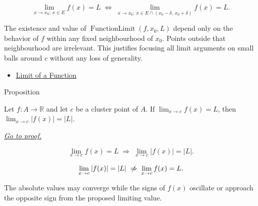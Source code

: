 \begin{remark*}
\[
  \lim_{x \to x_0;\, x \in E} f(x) = L
  \;\iff\;
  \lim_{x \to x_0;\, x \in E \cap (x_0 - \delta,\, x_0 + \delta)}
  f(x) = L.
\]
\end{remark*}

\begin{remark*}[Interpretation]
The existence and value of $\operatorname{FunctionLimit}(f, x_0, L)$
depend only on the behavior of $f$ within any fixed neighbourhood of
$x_0$. Points outside that neighbourhood are irrelevant. This
justifies focusing all limit arguments on small balls around $c$
without any loss of generality.
\end{remark*}

\begin{dependencies}
\begin{itemize}
  \item \hyperref[def:limit-function]{Limit of a Function}
\end{itemize}
\end{dependencies}


\begin{propositionbox}{Proposition}
\begin{proposition}
\label{prop:limit-absolute-value}
Let $f : A \to \mathbb{R}$ and let $c$ be a cluster point of $A$.
If $\lim_{x\to c}f(x)=L$, then
$\lim_{x\to c}|f(x)|=|L|$.

\smallskip\noindent
\hyperref[prf:limit-absolute-value]{\textit{Go to proof.}}
\end{proposition}
\end{propositionbox}

\begin{remark*}
\[
  \lim_{x\to c}f(x)=L
  \;\Rightarrow\;
  \lim_{x\to c}|f(x)|=|L|.
\]
\end{remark*}

\begin{remark*}
\[
  \lim_{x\to c}|f(x)|=|L|
  \;\centernot\Rightarrow\;
  \lim_{x\to c}f(x)=L.
\]
\end{remark*}

\begin{remark*}
The absolute values may converge while the signs of $f(x)$ oscillate or
approach the opposite sign from the proposed limiting value.
\end{remark*}

